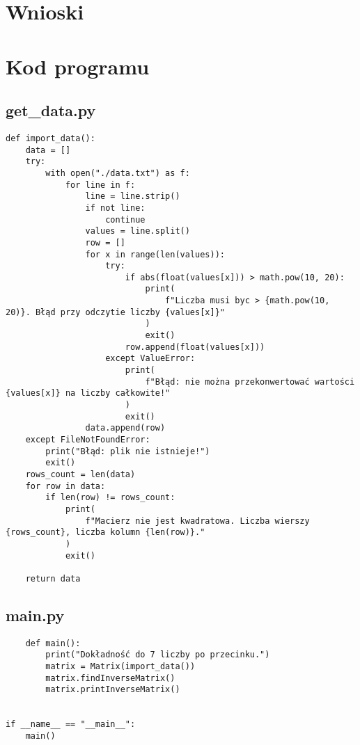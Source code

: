 \documentclass[12pt]{article}
\begin{document}
\section{Wnioski}
\section{Kod programu}
\subsection{get\_data.py}
\begin{verbatim}
def import_data():
    data = []
    try:
        with open("./data.txt") as f:
            for line in f:
                line = line.strip()
                if not line:
                    continue
                values = line.split()
                row = []
                for x in range(len(values)):
                    try:
                        if abs(float(values[x])) > math.pow(10, 20):
                            print(
                                f"Liczba musi byc > {math.pow(10, 20)}. Błąd przy odczytie liczby {values[x]}"
                            )
                            exit()
                        row.append(float(values[x]))
                    except ValueError:
                        print(
                            f"Błąd: nie można przekonwertować wartości {values[x]} na liczby całkowite!"
                        )
                        exit()
                data.append(row)
    except FileNotFoundError:
        print("Błąd: plik nie istnieje!")
        exit()
    rows_count = len(data)
    for row in data:
        if len(row) != rows_count:
            print(
                f"Macierz nie jest kwadratowa. Liczba wierszy {rows_count}, liczba kolumn {len(row)}."
            )
            exit()

    return data

\end{verbatim}
\subsection{main.py}
\begin{verbatim}
    def main():
        print("Dokładność do 7 liczby po przecinku.")
        matrix = Matrix(import_data())
        matrix.findInverseMatrix()
        matrix.printInverseMatrix()


if __name__ == "__main__":
    main()
\end{verbatim}
\end{document}
